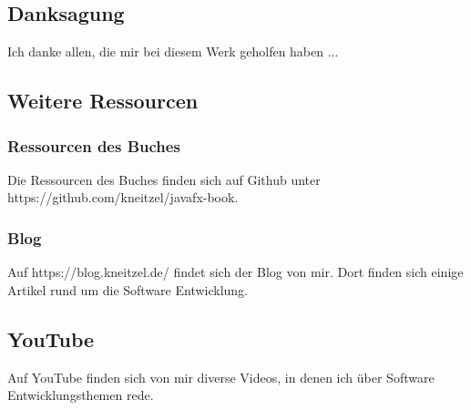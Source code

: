 \subsection{Danksagung}
Ich danke allen, die mir bei diesem Werk geholfen haben ...

\subsection{Weitere Ressourcen}

\subsubsection{Ressourcen des Buches}
Die Ressourcen des Buches finden sich auf Github unter https://github.com/kneitzel/javafx-book.

\subsubsection{Blog}
Auf https://blog.kneitzel.de/ findet sich der Blog von mir. Dort finden sich einige Artikel rund um die Software Entwicklung.

\subsection{YouTube}
Auf YouTube finden sich von mir diverse Videos, in denen ich über Software Entwicklungsthemen rede.

